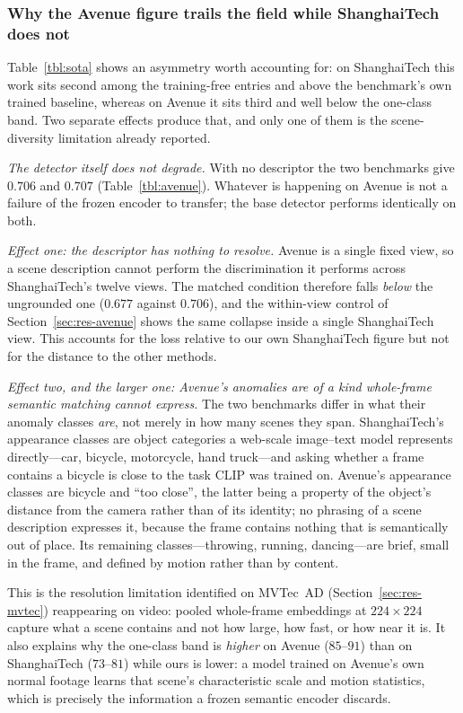 \documentclass[a4paper,fleqn]{cas-sc}
\begin{document}
\subsubsection{Why the Avenue figure trails the field while ShanghaiTech does not}
\label{sec:res-whyavenue}
Table~\ref{tbl:sota} shows an asymmetry worth accounting for: on ShanghaiTech
this work sits second among the training-free entries and above the benchmark's
own trained baseline, whereas on Avenue it sits third and well below the
one-class band. Two separate effects produce that, and only one of them is the
scene-diversity limitation already reported.

\emph{The detector itself does not degrade.} With no descriptor the two
benchmarks give $0.706$ and $0.707$ (Table~\ref{tbl:avenue}). Whatever is
happening on Avenue is not a failure of the frozen encoder to transfer; the
base detector performs identically on both.

\emph{Effect one: the descriptor has nothing to resolve.} Avenue is a single
fixed view, so a scene description cannot perform the discrimination it performs
across ShanghaiTech's twelve views. The matched condition therefore falls
\emph{below} the ungrounded one ($0.677$ against $0.706$), and the within-view
control of Section~\ref{sec:res-avenue} shows the same collapse inside a single
ShanghaiTech view. This accounts for the loss relative to our own ShanghaiTech
figure but not for the distance to the other methods.

\emph{Effect two, and the larger one: Avenue's anomalies are of a kind
whole-frame semantic matching cannot express.} The two benchmarks differ in what
their anomaly classes \emph{are}, not merely in how many scenes they span.
ShanghaiTech's appearance classes are object categories a web-scale
image--text model represents directly---car, bicycle, motorcycle, hand
truck---and asking whether a frame contains a bicycle is close to the task CLIP
was trained on. Avenue's appearance classes are bicycle and ``too close'',
the latter being a property of the object's distance from the camera rather
than of its identity; no phrasing of a scene description expresses it, because
the frame contains nothing that is semantically out of place. Its remaining
classes---throwing, running, dancing---are brief, small in the frame, and
defined by motion rather than by content.

This is the resolution limitation identified on MVTec~AD
(Section~\ref{sec:res-mvtec}) reappearing on video: pooled whole-frame embeddings
at $224\times224$ capture what a scene contains and not how large, how fast, or
how near it is. It also explains why the one-class band is \emph{higher} on
Avenue ($85$--$91$) than on ShanghaiTech ($73$--$81$) while ours is lower: a
model trained on Avenue's own normal footage learns that scene's characteristic
scale and motion statistics, which is precisely the information a frozen
semantic encoder discards.
\end{document}
